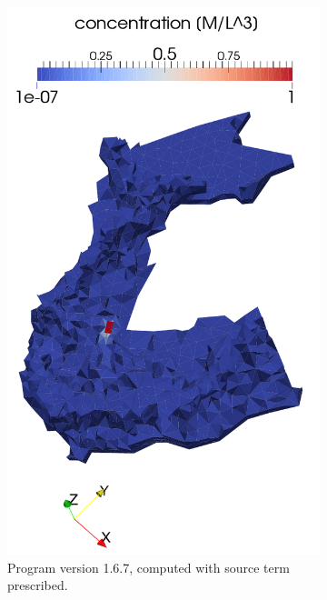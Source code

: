 \begin{figure}[!h]
\begin{subfigure}[b]{0.3\textwidth}
        \includegraphics[width=\textwidth]{tests_graphics/mel_long_end_167s.pdf}
        \caption{Program version 1.6.7, computed with source term prescribed.}
        \label{fig:bench_mel4b}
    \end{subfigure}
    ~
    \begin{subfigure}[b]{0.3\textwidth}
        \centering

\end{subfigure}
\end{figure}
